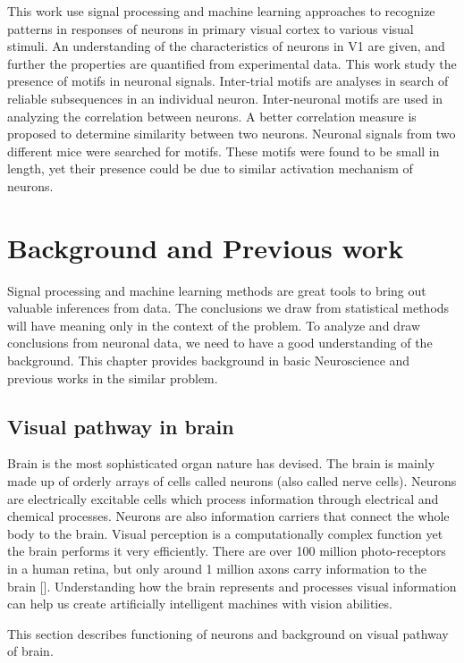 \documentclass[MTech]{iitmdiss}
\begin{document}
This work use signal processing and machine learning approaches to recognize patterns in responses of neurons in primary visual cortex to various visual stimuli. An understanding of the characteristics of neurons in V1 are given, and further the properties are quantified from experimental data. This work study the presence of motifs in neuronal signals. Inter-trial motifs are analyses in search of reliable subsequences in an individual neuron. Inter-neuronal motifs are used in analyzing the correlation between neurons. A better correlation measure is proposed to determine similarity between two neurons. Neuronal signals from two different mice were searched for motifs. These motifs were found to be small in length, yet their presence could be due to similar activation mechanism of neurons.

\chapter{Background and Previous work}    %
\label{chap:lit}
Signal processing and machine learning methods are great tools to bring out valuable inferences from data. The conclusions we draw from statistical methods will have meaning only in the context of the problem. To analyze and draw conclusions from neuronal data, we need to have a good understanding of the background. This chapter provides background in basic Neuroscience and previous works in the similar problem.
\section{Visual pathway in brain} %
\label{sec:visual_pathway_in_brain}
Brain is the most sophisticated organ nature has devised. The brain is mainly made up of orderly arrays of cells called neurons (also called nerve cells). Neurons are electrically excitable cells which process information through electrical and chemical processes. Neurons are also information carriers that connect the whole body to the brain. Visual perception is a computationally complex function yet the brain performs it very efficiently. There are over 100 million photo-receptors in a human retina, but only around 1 million axons carry information to the brain [\cite{bear2007neuroscience}]. Understanding how the brain represents and processes visual information can help us create artificially intelligent machines with vision abilities.

This section describes functioning of neurons and background on visual pathway of brain.
\end{document}
